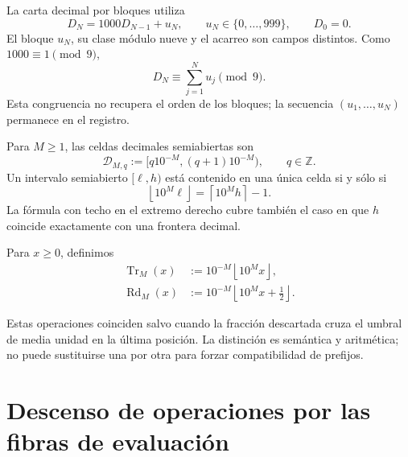 La carta decimal por bloques utiliza
\begin{equation}
 D_N=1000D_{N-1}+u_N,
 \qquad
 u_N\in\{0,\ldots,999\},
 \qquad D_0=0.
 \label{p12-83-c18-s1:eq:concatenacion-base-mil-u024}
\end{equation}
El bloque \(u_N\), su clase módulo nueve y el acarreo son campos distintos.
Como \(1000\equiv1\pmod9\),
\begin{equation}
 D_N\equiv\sum_{j=1}^{N}u_j\pmod9.
 \label{p12-83-c18-s1:eq:base-mil-compatible-mod9-u024}
\end{equation}
Esta congruencia no recupera el orden de los bloques; la secuencia
\((u_1,\ldots,u_N)\) permanece en el registro.

Para \(M\geq1\), las celdas decimales semiabiertas son
\begin{equation}
 \mathcal D_{M,q}
 :=[q10^{-M},(q+1)10^{-M}),
 \qquad q\in\mathbb Z.
 \label{p12-83-c18-s1:eq:celda-decimal-semiabierta-u024}
\end{equation}
Un intervalo semiabierto \([\ell,h)\) está contenido en una única celda si
y sólo si
\begin{equation}
 \left\lfloor10^M\ell\right\rfloor
 =\left\lceil10^Mh\right\rceil-1.
 \label{p12-83-c18-s1:eq:criterio-exacto-celda-decimal-u024}
\end{equation}
La fórmula con techo en el extremo derecho cubre también el caso en que
\(h\) coincide exactamente con una frontera decimal.

\begin{definition}
Para \(x\geq0\), definimos
\begin{align}
 \operatorname{Tr}_M(x)
 &:=10^{-M}\left\lfloor10^Mx\right\rfloor,
 \label{p12-83-c18-s1:eq:truncamiento-decimal-u024}\\
 \operatorname{Rd}_M(x)
 &:=10^{-M}\left\lfloor10^Mx+\frac12\right\rfloor.
 \label{p12-83-c18-s1:eq:redondeo-decimal-u024}
\end{align}
\end{definition}
Estas operaciones coinciden salvo cuando la fracción descartada cruza el
umbral de media unidad en la última posición. La distinción es semántica y
aritmética; no puede sustituirse una por otra para forzar compatibilidad de
prefijos.

\section{Descenso de operaciones por las fibras de evaluación}


